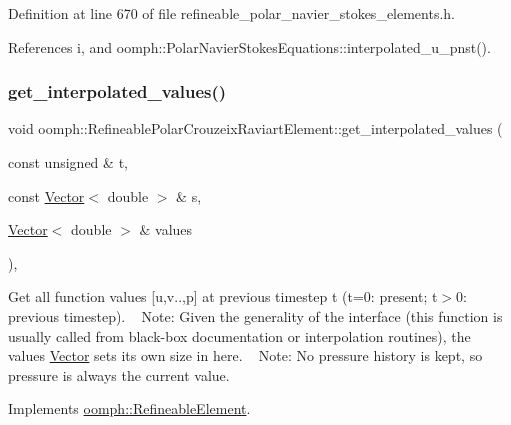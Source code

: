 Definition at line 670 of file refineable\+\_\+polar\+\_\+navier\+\_\+stokes\+\_\+elements.\+h.



References i, and oomph\+::\+Polar\+Navier\+Stokes\+Equations\+::interpolated\+\_\+u\+\_\+pnst().

\mbox{\label{classoomph_1_1RefineablePolarCrouzeixRaviartElement_a6d575d706d3b3689965726ca49d1a55a}} 
\subsubsection{\texorpdfstring{get\+\_\+interpolated\+\_\+values()}{get\_interpolated\_values()}\hspace{0.1cm}{\footnotesize\ttfamily [2/2]}}
{\footnotesize\ttfamily void oomph\+::\+Refineable\+Polar\+Crouzeix\+Raviart\+Element\+::get\+\_\+interpolated\+\_\+values (\begin{DoxyParamCaption}\item[{const unsigned \&}]{t,  }\item[{const \hyperlink{classoomph_1_1Vector}{Vector}$<$ double $>$ \&}]{s,  }\item[{\hyperlink{classoomph_1_1Vector}{Vector}$<$ double $>$ \&}]{values }\end{DoxyParamCaption})\hspace{0.3cm}{\ttfamily [inline]}, {\ttfamily [virtual]}}



Get all function values \mbox{[}u,v..,p\mbox{]} at previous timestep t (t=0\+: present; t$>$0\+: previous timestep). ~\newline
 Note\+: Given the generality of the interface (this function is usually called from black-\/box documentation or interpolation routines), the values \hyperlink{classoomph_1_1Vector}{Vector} sets its own size in here. ~\newline
Note\+: No pressure history is kept, so pressure is always the current value. 



Implements \hyperlink{classoomph_1_1RefineableElement_ada6f0efe831ffefb1d2829ce01d45bfc}{oomph\+::\+Refineable\+Element}.



